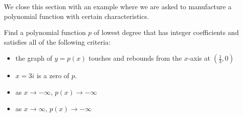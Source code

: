 We close this section with an example where we are asked to manufacture a polynomial function with certain characteristics.

\begin{example}  
Find a polynomial function $p$ of lowest degree that has integer coefficients and satisfies all of the following criteria:

\begin{itemize}

\item  the graph of $y=p(x)$ touches and rebounds from the $x$-axis at $\left(\frac{1}{3}, 0\right)$

\item  $x=3i$ is a zero of $p$.

\item  as $x \rightarrow -\infty$, $p(x) \rightarrow -\infty$

\item  as $x \rightarrow \infty$, $p(x) \rightarrow -\infty$


\end{itemize}


\begin{center}


\end{center}

\end{example}

